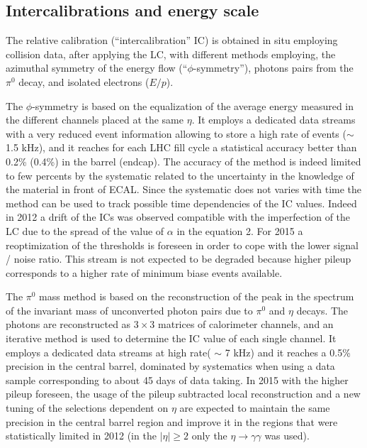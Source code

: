 \documentclass[journal]{IEEEtran}
\begin{document}
\subsection{Intercalibrations and energy scale}
The relative calibration (“intercalibration” IC) is obtained in situ employing collision data, after applying the LC, with different methods employing, the azimuthal symmetry of the energy flow (``$\phi$-symmetry''), photons pairs from the $\pi^0$ decay, and isolated electrons ($E/p$).

The $\phi$-symmetry is based on the equalization of the average energy measured in the different channels placed at the same $\eta$. It employs a dedicated data streams with a very reduced event information allowing to store a high rate of events ($\sim$ 1.5 kHz), and it reaches for each LHC fill cycle a statistical accuracy better than 0.2\% (0.4\%) in the barrel (endcap). The accuracy of the method is indeed limited to few percents by the systematic related to the uncertainty in the knowledge of the material in front of ECAL. Since the systematic does not varies with time the method can be used to track possible time dependencies of the IC values. Indeed in 2012 a drift of the ICs was observed compatible with the imperfection of the LC due to the spread of the value of $\alpha$ in the equation 2. For 2015 a reoptimization of the thresholds is foreseen in order to cope with the lower signal / noise ratio. This stream is not expected to be degraded because higher pileup corresponds to a higher rate of minimum biase events available.

The $\pi^0$ mass method is based on the reconstruction of the peak in the spectrum of the invariant mass of unconverted photon pairs due to $\pi^0$ and $\eta$ decays. The photons are reconstructed as $3 \times 3$ matrices of calorimeter channels, and an iterative method is used to determine the IC value of each single channel. It employs a dedicated data streams at high rate( $\sim$ 7 kHz) and it reaches a 0.5\% precision in the central barrel, dominated by systematics when using a data sample corresponding to about 45 days of data taking. In 2015 with the higher pileup foreseen, the usage of the pileup subtracted local reconstruction and a new tuning of the selections dependent on $\eta$ are expected to maintain the same precision in the central barrel region and improve it in the regions that were statistically limited in 2012 (in the $\vert\eta\vert\ge2$ only the $\eta\to\gamma\gamma$ was used).
\end{document}

